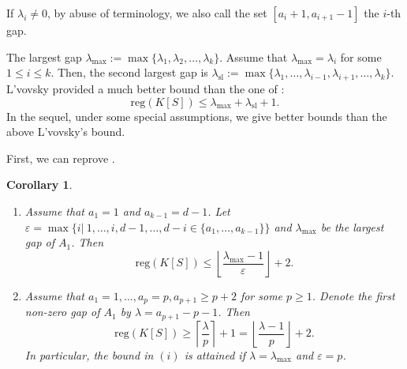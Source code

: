 \documentclass[11pt]{article}
\newtheorem{Corollary}[Theorem]{Corollary}
\def\reg{\mathrm{reg}}
\theoremstyle{remark}
\theoremstyle{definition}
\begin{document}
If $\lambda_i \neq 0$, by abuse of terminology, we also call the set $[a_i+1, a_{i+1}-1]$ the $i$-th gap.

The largest gap $\lambda_{\max} := \max\{ \lambda_1,\lambda_2,\ldots,\lambda_k\}$. Assume that $\lambda_{\max} = \lambda_i$ for some $1\leq i \leq k$. Then, the second largest gap is  $\lambda_{\mathrm{sl}} := \max\{ \lambda_1,\ldots,\lambda_{i-1},\lambda_{i+1},\ldots,\lambda_k\}$.
L'vovsky \cite{Lv} provided a much better bound than the one of \cite{GLP}: 
$$\reg(K[S]) \leq \lambda_{\max} + \lambda_{\mathrm{sl}} + 1.$$
In the sequel,  under some special  assumptions, we give better bounds than the above L'vovsky's bound.

First, we can reprove \cite[Theorem 2.7 and Proposition 3.4]{HeHS}.
\begin{Corollary} \label{A5} 
\begin{enumerate}[\((i)\)]
    \item Assume that $a_1=1$ and $a_{k-1} = d-1$. Let $\varepsilon = \max\{i|\ 1,\ldots,i, d-1,\ldots,d-i \in \{a_1,\ldots,a_{k-1} \}\}$ and $\lambda_{\max}$ be the largest gap of $A_1$. Then
$$\reg(K[S]) \leq \left\lfloor \frac{\lambda_{\max} -1}{\varepsilon} \right\rfloor + 2.$$
\item Assume that $a_1=1,\ldots,a_p = p, a_{p+1} \ge p+2$ for some $p\ge 1$. Denote the first non-zero gap of $A_1$ by $\lambda = a_{p+1}-p-1$. Then
$$\reg(K[S]) \geq \left\lceil \frac{\lambda}{p} \right\rceil + 1 = \left\lfloor \frac{\lambda -1}{p} \right\rfloor + 2.$$
In particular,  the bound in \((i)\) is attained if $\lambda = \lambda_{\max}$ and $ \varepsilon = p$.
\end{enumerate}
\end{Corollary}
\end{document}

